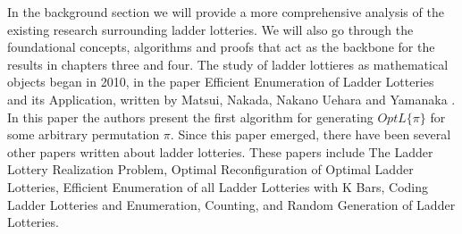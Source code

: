 
In the background section we will provide a more comprehensive analysis of the existing research surrounding ladder lotteries. 
We will also go through the foundational concepts, algorithms and proofs that act as the backbone for the 
results  in chapters three and four. 
The study of ladder lottieres as mathematical objects began in 2010, in the paper
Efficient Enumeration of Ladder Lotteries and its Application, written by Matsui, Nakada, Nakano Uehara and Yamanaka \cite{A1}. 
    In this paper the authors present the first algorithm for generating $OptL\{\pi\}$ for some  
    arbitrary permutation $\pi$. Since this paper emerged, there have been 
    several other papers written about ladder lotteries. 
    These papers include The Ladder Lottery Realization Problem,
    Optimal Reconfiguration of Optimal Ladder Lotteries, 
    Efficient Enumeration of all Ladder Lotteries with K Bars,
    Coding Ladder Lotteries and
    Enumeration, Counting, and Random Generation of Ladder Lotteries.